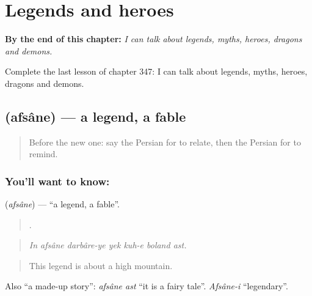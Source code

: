 
\chapter{Legends and heroes}
\label{ch:fa-legends-and-heroes}

\begin{chapteropening}
\textbf{By the end of this chapter:} \emph{I can talk about legends, myths, heroes, dragons and demons.}

Complete the last lesson of chapter 347: I can talk about legends, myths, heroes, dragons and demons.
\end{chapteropening}

\section[\texorpdfstring{\fa{افسانه} (afsâne)}{افسانه (afsâne)}]{ (afsâne) — a legend, a fable}

\label{lesson:FA-C347-afsane}



\begin{quote}
Before the new one: say the Persian for to relate, then the Persian for to remind.
\end{quote}

\subsection*{You'll want to know: }
\textbf{} (\emph{afsâne}) — \textquotedblleft{}a legend, a fable\textquotedblright{}.

\begin{quote}
      .
\end{quote}

\begin{quote}
\emph{In afsâne darbâre-ye yek kuh-e boland ast.}
\end{quote}

\begin{quote}
This legend is about a high mountain.
\end{quote}

Also \textquotedblleft{}a made-up story\textquotedblright{}: \emph{afsâne ast} \textquotedblleft{}it is a fairy tale\textquotedblright{}. \emph{Afsâne-i} \textquotedblleft{}legendary\textquotedblright{}.

